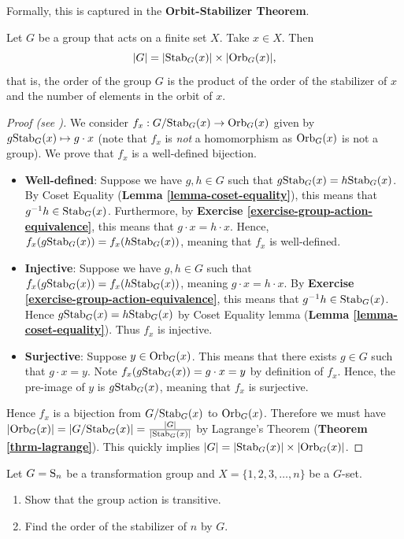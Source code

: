 Formally, this is captured in the \textbf{Orbit-Stabilizer Theorem}.
\begin{theorem}\label{thrm-orbit-stabilizer}
    Let $G$ be a group that acts on a finite set $X$. Take $x \in X$. Then
    \[
        |G| = |\mathrm{Stab}_{G}(x)| \times |\mathrm{Orb}_{G}(x)|,
    \]
    that is, the order of the group $G$ is the product of the order of the stabilizer of $x$ and the number of elements in the orbit of $x$.
\end{theorem}

\begin{proof}[Proof (see \cite{humphreys_1996})]
    We consider $f_x: G/\mathrm{Stab}_{G}(x) \to \mathrm{Orb}_{G}(x)$ given by $g\mathrm{Stab}_{G}(x) \mapsto g \cdot x$ (note that $f_x$ is \textit{not} a homomorphism as $\mathrm{Orb}_{G}(x)$ is not a group). We prove that $f_x$ is a well-defined bijection.
    \begin{itemize}
        \item \textbf{Well-defined}: Suppose we have $g, h \in G$ such that $g\mathrm{Stab}_{G}(x) = h\mathrm{Stab}_{G}(x)$. By Coset Equality (\textbf{Lemma \ref{lemma-coset-equality}}), this means that $g^{-1}h \in \mathrm{Stab}_{G}(x)$. Furthermore, by \textbf{Exercise \ref{exercise-group-action-equivalence}}, this means that $g\cdot x = h\cdot x$. Hence, $f_x(g\mathrm{Stab}_{G}(x)) = f_x(h\mathrm{Stab}_{G}(x))$, meaning that $f_x$ is well-defined.
        \item \textbf{Injective}: Suppose we have $g, h \in G$ such that $f_x(g\mathrm{Stab}_{G}(x)) = f_x(h\mathrm{Stab}_{G}(x))$, meaning $g\cdot x = h\cdot x$. By \textbf{Exercise \ref{exercise-group-action-equivalence}}, this means that $g^{-1}h \in \mathrm{Stab}_{G}(x)$. Hence $g\mathrm{Stab}_{G}(x) = h\mathrm{Stab}_{G}(x)$ by Coset Equality lemma (\textbf{Lemma \ref{lemma-coset-equality}}). Thus $f_x$ is injective.
        \item \textbf{Surjective}: Suppose $y \in \mathrm{Orb}_{G}(x)$. This means that there exists $g \in G$ such that $g\cdot x = y$. Note $f_x(g\mathrm{Stab}_{G}(x)) = g\cdot x = y$ by definition of $f_x$. Hence, the pre-image of $y$ is $g\mathrm{Stab}_{G}(x)$, meaning that $f_x$ is surjective.
    \end{itemize}
    Hence $f_x$ is a bijection from $G/\mathrm{Stab}_{G}(x)$ to $\mathrm{Orb}_{G}(x)$. Therefore we must have $|\mathrm{Orb}_{G}(x)| = |G/\mathrm{Stab}_{G}(x)| = \frac{|G|}{|\mathrm{Stab}_{G}(x)|}$ by Lagrange's Theorem (\textbf{Theorem \ref{thrm-lagrange}}). This quickly implies $|G| = |\mathrm{Stab}_{G}(x)|\times|\mathrm{Orb}_{G}(x)|$.
\end{proof}

\begin{exercise}
    Let $G = \mathrm{S}_{n}$ be a transformation group and $X = \{1, 2, 3, \dots, n\}$ be a $G$-set.
    \begin{enumerate}[label=(\roman*)]
        \item Show that the group action is transitive.
        \item Find the order of the stabilizer of $n$ by $G$.
    \end{enumerate}
\end{exercise}

